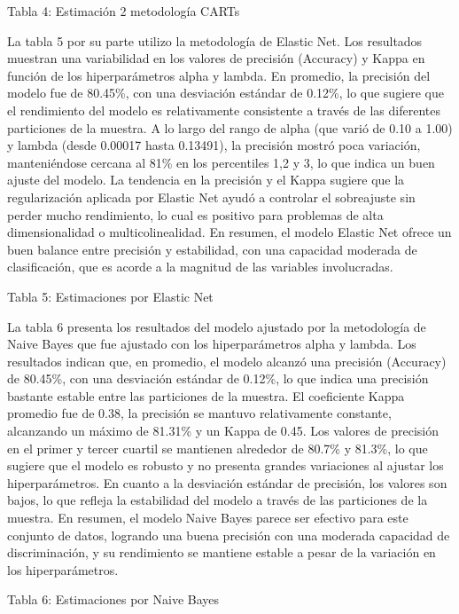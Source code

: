 \documentclass[12pt,a4paper,onecolumn]{article}
\begin{document}
{\color{blue} Tabla 4: Estimación 2 metodología CARTs}

La tabla 5 por su parte utilizo la metodología de Elastic Net. Los resultados muestran una variabilidad en los valores de precisión (Accuracy) y Kappa en función de los hiperparámetros alpha y lambda. En promedio, la precisión del modelo fue de 80.45\%, con una desviación estándar de 0.12\%, lo que sugiere que el rendimiento del modelo es relativamente consistente a través de las diferentes particiones de la muestra. A lo largo del rango de alpha (que varió de 0.10 a 1.00) y lambda (desde 0.00017 hasta 0.13491), la precisión mostró poca variación, manteniéndose cercana al 81\% en los percentiles 1,2 y 3, lo que indica un buen ajuste del modelo. La tendencia en la precisión y el Kappa sugiere que la regularización aplicada por Elastic Net ayudó a controlar el sobreajuste sin perder mucho rendimiento, lo cual es positivo para problemas de alta dimensionalidad o multicolinealidad. En resumen, el modelo Elastic Net ofrece un buen balance entre precisión y estabilidad, con una capacidad moderada de clasificación, que es acorde a la magnitud de las variables involucradas.

{\color{blue} Tabla 5: Estimaciones por Elastic Net}

La tabla 6 presenta los resultados del modelo ajustado por la metodología de Naive Bayes que fue ajustado con los hiperparámetros alpha y lambda. Los resultados indican que, en promedio, el modelo alcanzó una precisión (Accuracy) de 80.45\%, con una desviación estándar de 0.12\%, lo que indica una precisión bastante estable entre las particiones de la muestra. El coeficiente Kappa promedio fue de 0.38, la precisión se mantuvo relativamente constante, alcanzando un máximo de 81.31\% y un Kappa de 0.45. Los valores de precisión en el primer y tercer cuartil se mantienen alrededor de 80.7\% y 81.3\%, lo que sugiere que el modelo es robusto y no presenta grandes variaciones al ajustar los hiperparámetros. En cuanto a la desviación estándar de precisión, los valores son bajos, lo que refleja la estabilidad del modelo a través de las particiones de la muestra. En resumen, el modelo Naive Bayes parece ser efectivo para este conjunto de datos, logrando una buena precisión con una moderada capacidad de discriminación, y su rendimiento se mantiene estable a pesar de la variación en los hiperparámetros.

{\color{blue} Tabla 6: Estimaciones por Naive Bayes}
\end{document}
